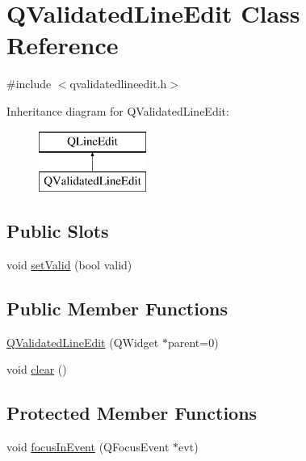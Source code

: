\hypertarget{class_q_validated_line_edit}{}\section{Q\+Validated\+Line\+Edit Class Reference}
\label{class_q_validated_line_edit}


{\ttfamily \#include $<$qvalidatedlineedit.\+h$>$}

Inheritance diagram for Q\+Validated\+Line\+Edit\+:\begin{figure}[H]
\begin{center}
\leavevmode
\includegraphics[height=2.000000cm]{class_q_validated_line_edit}
\end{center}
\end{figure}
\subsection*{Public Slots}
\begin{DoxyCompactItemize}
\item 
void \hyperlink{class_q_validated_line_edit_ad9984e2e463cc7fbf28fe334498a1df5}{set\+Valid} (bool valid)
\end{DoxyCompactItemize}
\subsection*{Public Member Functions}
\begin{DoxyCompactItemize}
\item 
\hyperlink{class_q_validated_line_edit_a1d739b7cf9a4ed066bb73decf374293f}{Q\+Validated\+Line\+Edit} (Q\+Widget $\ast$parent=0)
\item 
void \hyperlink{class_q_validated_line_edit_aee2a648f6f4904f21e55871afbddefa9}{clear} ()
\end{DoxyCompactItemize}
\subsection*{Protected Member Functions}
\begin{DoxyCompactItemize}
\item 
void \hyperlink{class_q_validated_line_edit_a914d4efae9ac7c74faa3a4a82d26fec3}{focus\+In\+Event} (Q\+Focus\+Event $\ast$evt)
\end{DoxyCompactItemize}


